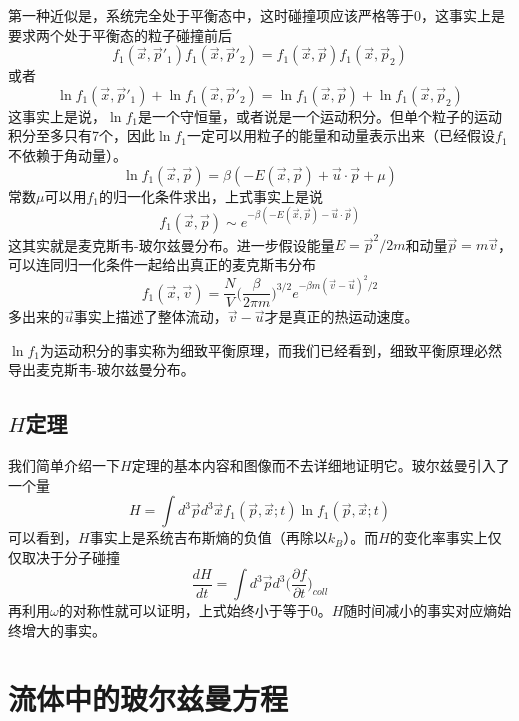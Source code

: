 \documentclass[a4paper,11pt]{ctexart}
\newcommand{\beq}{\begin{equation}}
\newcommand{\eeq}{\end{equation}}
\newcommand{\red}{\color{red}}
\newcommand{\pfrac}[2]{\frac{\partial #1}{\partial #2}}
\begin{document}
\par
第一种近似是，系统完全处于平衡态中，这时碰撞项应该严格等于0，这事实上是要求两个处于平衡态的粒子碰撞前后
\beq
f_1(\vec{x},\vec{p}'_1)f_1(\vec{x},\vec{p}'_2) =f_1(\vec{x},\vec{p})f_1(\vec{x},\vec{p}_2)
\eeq
或者
\beq
\ln f_1(\vec{x},\vec{p}'_1) + \ln f_1(\vec{x},\vec{p}'_2) = \ln f_1(\vec{x},\vec{p}) + \ln f_1(\vec{x},\vec{p}_2)
\eeq
这事实上是说，$\ln f_1$是一个守恒量，或者说是一个运动积分。但单个粒子的运动积分至多只有7个，因此$\ln f_1$一定可以用粒子的能量和动量表示出来（已经假设$f_1$不依赖于角动量）。
\beq
\ln f_1(\vec{x},\vec{p}) = \beta (-E(\vec{x},\vec{p}) + \vec{u} \cdot \vec{p} + \mu)
\eeq
常数$\mu$可以用$f_1$的归一化条件求出，上式事实上是说
\beq
f_1(\vec{x},\vec{p}) \sim e^{-\beta (-E(\vec{x},\vec{p}) - \vec{u} \cdot \vec{p})}
\eeq
这其实就是麦克斯韦-玻尔兹曼分布。进一步假设能量$E = \vec{p}^2/2m$和动量$\vec{p} = m\vec{v}$，可以连同归一化条件一起给出真正的麦克斯韦分布
\beq
f_1(\vec{x},\vec{v})  =  \frac{N}{V} \big( \frac{\beta}{2\pi m}\big)^{3/2} e^{-\beta m (\vec{v} - \vec{u})^2/2}
\eeq
多出来的$\vec{u}$事实上描述了整体流动，$\vec{v}-\vec{u}$才是真正的热运动速度。
\par
$\ln f_1$为运动积分的事实称为{\red 细致平衡原理}，而我们已经看到，细致平衡原理必然导出麦克斯韦-玻尔兹曼分布。

\subsection{$H$定理}
我们简单介绍一下$H$定理的基本内容和图像而不去详细地证明它。玻尔兹曼引入了一个量
\beq
H = \int d^3 \vec{p} d^3 \vec{x} f_1(\vec{p},\vec{x};t) \ln f_1(\vec{p},\vec{x};t)
\eeq
可以看到，$H$事实上是系统吉布斯熵的负值（再除以$k_B$）。而$H$的变化率事实上仅仅取决于分子碰撞
\beq
\frac{dH}{dt} = \int d^3 \vec{p} d^3 \bigg(\pfrac{f}{t}\bigg)_{coll}
\eeq
再利用$\omega$的对称性就可以证明，上式始终小于等于0。$H$随时间减小的事实对应熵始终增大的事实。

\section{流体中的玻尔兹曼方程}
\end{document}
